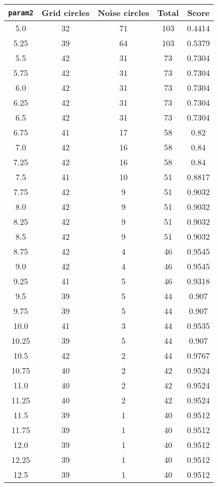 \documentclass[letterpaper, 12pt]{article}
\begin{document}
\begin{longtable}{|c|c|c|c|c|}
\hline
\textbf{\texttt{param2}} & \textbf{Grid circles} & \textbf{Noise circles} & \textbf{Total} & \textbf{Score} \\
\hline
5.0 & 32 & 71 & 103 & 0.4414 \\
\hline
5.25 & 39 & 64 & 103 & 0.5379 \\
\hline
5.5 & 42 & 31 & 73 & 0.7304 \\
\hline
5.75 & 42 & 31 & 73 & 0.7304 \\
\hline
6.0 & 42 & 31 & 73 & 0.7304 \\
\hline
6.25 & 42 & 31 & 73 & 0.7304 \\
\hline
6.5 & 42 & 31 & 73 & 0.7304 \\
\hline
6.75 & 41 & 17 & 58 & 0.82 \\
\hline
7.0 & 42 & 16 & 58 & 0.84 \\
\hline
7.25 & 42 & 16 & 58 & 0.84 \\
\hline
7.5 & 41 & 10 & 51 & 0.8817 \\
\hline
7.75 & 42 & 9 & 51 & 0.9032 \\
\hline
8.0 & 42 & 9 & 51 & 0.9032 \\
\hline
8.25 & 42 & 9 & 51 & 0.9032 \\
\hline
8.5 & 42 & 9 & 51 & 0.9032 \\
\hline
8.75 & 42 & 4 & 46 & 0.9545 \\
\hline
9.0 & 42 & 4 & 46 & 0.9545 \\
\hline
9.25 & 41 & 5 & 46 & 0.9318 \\
\hline
9.5 & 39 & 5 & 44 & 0.907 \\
\hline
9.75 & 39 & 5 & 44 & 0.907 \\
\hline
10.0 & 41 & 3 & 44 & 0.9535 \\
\hline
10.25 & 39 & 5 & 44 & 0.907 \\
\hline
10.5 & 42 & 2 & 44 & 0.9767 \\
\hline
10.75 & 40 & 2 & 42 & 0.9524 \\
\hline
11.0 & 40 & 2 & 42 & 0.9524 \\
\hline
11.25 & 40 & 2 & 42 & 0.9524 \\
\hline
11.5 & 39 & 1 & 40 & 0.9512 \\
\hline
11.75 & 39 & 1 & 40 & 0.9512 \\
\hline
12.0 & 39 & 1 & 40 & 0.9512 \\
\hline
12.25 & 39 & 1 & 40 & 0.9512 \\
\hline
12.5 & 39 & 1 & 40 & 0.9512 \\

\end{longtable}
\end{document}
